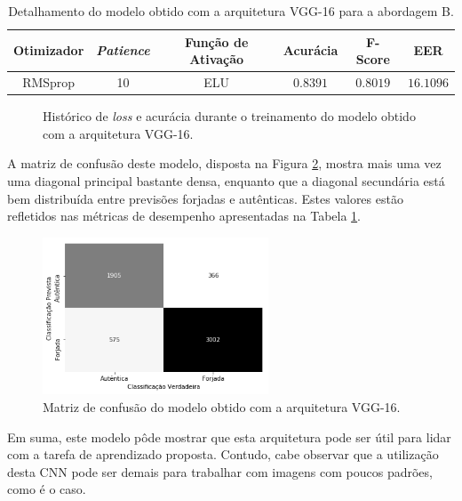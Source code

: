 \begin{table}[h!]
\centering
\caption{Detalhamento do modelo obtido com a arquitetura VGG-16 para a abordagem B.}
\label{tab:vgg}
\begin{tabular}{cccccc}
\toprule
\textbf{Otimizador} & \textbf{\emph{Patience}}  & \textbf{Função de Ativação} & \textbf{Acurácia} & \textbf{F-Score} & \textbf{EER} \\
\midrule
RMSprop & 10 & ELU & $0.8391$ & $0.8019$ & $16.1096$ \\
\bottomrule
\end{tabular}
\end{table}

\begin{figure}[H]
\centering
\caption{Histórico de \emph{loss} e acurácia durante o treinamento do modelo obtido com a arquitetura VGG-16.}
\label{fig:treinamento-vgg}
\hfill
{}
\end{figure}

A matriz de confusão deste modelo, disposta na Figura \ref{fig:matrizes-vgg}, mostra mais uma vez uma diagonal principal bastante densa, enquanto que a diagonal secundária está bem distribuída entre previsões forjadas e autênticas. Estes valores estão refletidos nas métricas de desempenho apresentadas na Tabela \ref{tab:vgg}.

\begin{figure}[h]
    \centering
    \caption{Matriz de confusão do modelo obtido com a arquitetura VGG-16.}\label{fig:matrizes-vgg}
    \includegraphics[width=0.6\textwidth]{imgs/matriz-vgg}
\end{figure}

Em suma, este modelo pôde mostrar que esta arquitetura pode ser útil para lidar com a tarefa de aprendizado proposta. Contudo, cabe observar que a utilização desta CNN pode ser demais para trabalhar com imagens com poucos padrões, como é o caso.